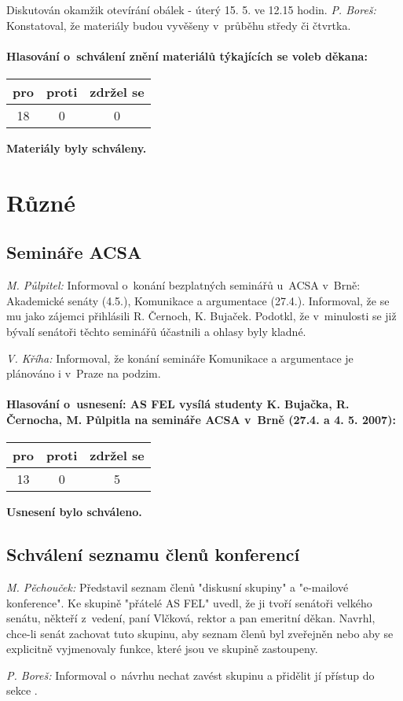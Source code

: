 \documentclass[a4paper,12pt,notitlepage,oneside]{article}
\newcommand{\hlasovani}[3]{\begin{center}
\begin{tabular}{|c|c|c|}\hline
pro& proti & zdržel se \\ \hline
#1 & #2 & #3 \\ \hline
\end{tabular}
\end{center}}
\begin{document}
Diskutován okamžik otevírání obálek - úterý 15. 5. ve 12.15 hodin.
\textit{P. Boreš:} Konstatoval, že materiály budou vyvěšeny v~průběhu středy či čtvrtka.

\paragraph{Hlasování o~schválení znění materiálů týkajících se voleb děkana:}
\hlasovani{18}{0}{0}
\textbf{Materiály byly schváleny.}


\section{Různé}
\subsection{Semináře ACSA}
\textit{M. Půlpitel:} Informoval o~konání bezplatných seminářů u~ACSA v~Brně: Akademické senáty (4.5.), Komunikace a argumentace (27.4.). Informoval, že se mu jako zájemci přihlásili R. Černoch, K. Bujaček. Podotkl, že v~minulosti se již bývalí senátoři těchto seminářů účastnili a ohlasy byly kladné.

\textit{V. Kříha:} Informoval, že konání semináře Komunikace a argumentace je plánováno i v~Praze na podzim.
 
\paragraph{Hlasování o~usnesení: AS FEL vysílá studenty K. Bujačka, R. Černocha, M. Půlpitla na semináře ACSA v~Brně (27.4. a 4. 5. 2007):}
\hlasovani{13}{0}{5}
\textbf{Usnesení bylo schváleno.}

\subsection{Schválení seznamu členů konferencí}
\textit{M. Pěchouček:} Představil seznam členů "diskusní skupiny" a "e-mailové konference". Ke skupině "přátelé AS FEL" uvedl, že ji tvoří senátoři velkého senátu, někteří z~vedení, paní Vlčková, rektor a pan emeritní děkan. Navrhl, chce-li senát zachovat tuto skupinu, aby seznam členů byl zveřejněn nebo aby se explicitně vyjmenovaly funkce, které jsou ve skupině zastoupeny.

\textit{P. Boreš:} Informoval o~návrhu nechat zavést skupinu  a přidělit jí přístup do sekce .
\end{document}

